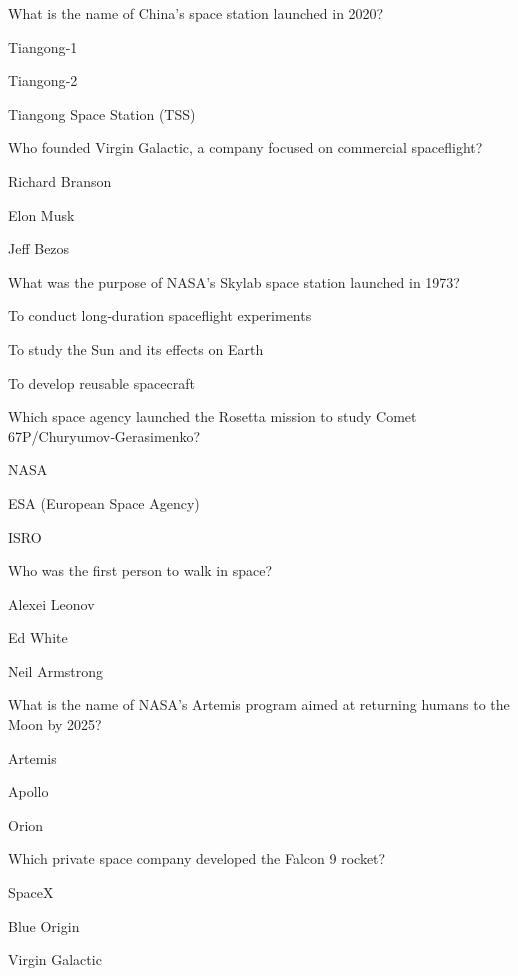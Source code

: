 \begin{enhancedmcq}{What is the name of China's space station launched in 2020?}
\item Tiangong‑1
\item Tiangong‑2
\item Tiangong Space Station (TSS)

\end{enhancedmcq}
\begin{enhancedmcq}{Who founded Virgin Galactic, a company focused on commercial spaceflight?}
\item Richard Branson
\item Elon Musk
\item Jeff Bezos

\end{enhancedmcq}
\begin{enhancedmcq}{What was the purpose of NASA's Skylab space station launched in 1973?}
\item To conduct long‑duration spaceflight experiments
\item To study the Sun and its effects on Earth
\item To develop reusable spacecraft

\end{enhancedmcq}
\begin{enhancedmcq}{Which space agency launched the Rosetta mission to study Comet 67P/Churyumov‑Gerasimenko?}
\item NASA
\item ESA (European Space Agency)
\item ISRO

\end{enhancedmcq}
\begin{enhancedmcq}{Who was the first person to walk in space?}
\item Alexei Leonov
\item Ed White
\item Neil Armstrong

\end{enhancedmcq}
\begin{enhancedmcq}{What is the name of NASA's Artemis program aimed at returning humans to the Moon by 2025?}
\item Artemis
\item Apollo
\item Orion

\end{enhancedmcq}
\begin{enhancedmcq}{Which private space company developed the Falcon 9 rocket?}
\item SpaceX
\item Blue Origin
\item Virgin Galactic

\end{enhancedmcq}
